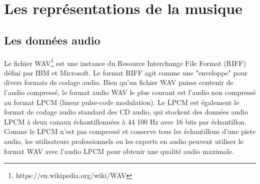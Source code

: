 \section{Les représentations de la musique}
\subsection*{Les données audio}
Le fichier WAV\footnote{https://en.wikipedia.org/wiki/WAV} est une instance du
Resource Interchange File Format (RIFF) défini par IBM et Microsoft. Le format
RIFF agit comme une "enveloppe" pour divers formats de codage audio.
Bien qu'un fichier WAV puisse contenir de l'audio compressé, le format audio
WAV le plus courant est l'audio non compressé au format LPCM (linear pulse-code
modulation). Le LPCM est également le format de codage audio standard des CD
audio, qui stockent des données audio LPCM à deux canaux échantillonnées à
44 100 Hz avec 16 bits par échantillon. Comme le LPCM n'est pas compressé et
conserve tous les échantillons d'une piste audio, les utilisateurs
professionnels ou les experts en audio peuvent utiliser le format WAV avec
l'audio LPCM pour obtenir une qualité audio maximale.
